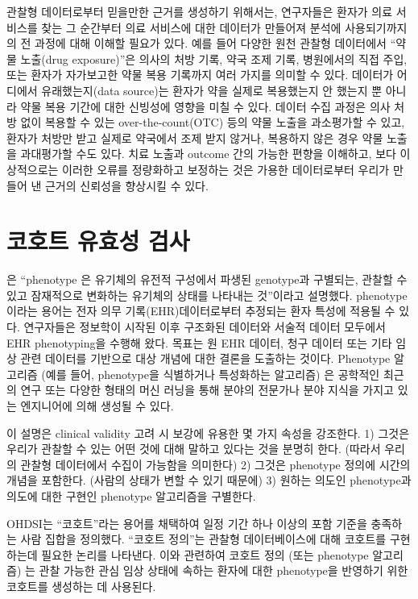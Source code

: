 \documentclass[11pt]{book}
\theoremstyle{definition}
\theoremstyle{definition}
\theoremstyle{definition}
\theoremstyle{remark}
\begin{document}
관찰형 데이터로부터 믿을만한 근거를 생성하기 위해서는, 연구자들은 환자가
의료 서비스를 찾는 그 순간부터 의료 서비스에 대한 데이터가 만들어져
분석에 사용되기까지의 전 과정에 대해 이해할 필요가 있다. 예를 들어
다양한 원천 관찰형 데이터에서 ``약물 노출(drug exposure)''은 의사의 처방
기록, 약국 조제 기록, 병원에서의 직접 주입, 또는 환자가 자가보고한 약물
복용 기록까지 여러 가지를 의미할 수 있다. 데이터가 어디에서
유래했는지(data source)는 환자가 약을 실제로 복용했는지 안 했는지 뿐
아니라 약물 복용 기간에 대한 신빙성에 영향을 미칠 수 있다. 데이터 수집
과정은 의사 처방 없이 복용할 수 있는 over-the-count(OTC) 등의 약물
노출을 과소평가할 수 있고, 환자가 처방만 받고 실제로 약국에서 조제 받지
않거나, 복용하지 않은 경우 약물 노출을 과대평가할 수도 있다. 치료 노출과
outcome 간의 가능한 편향을 이해하고, 보다 이상적으로는 이러한 오류를
정량화하고 보정하는 것은 가용한 데이터로부터 우리가 만들어 낸 근거의
신뢰성을 향상시킬 수 있다.

\section{코호트 유효성 검사}\label{CohortValidation}

\citet{hripcsak_2017} 은 ``phenotype 은 유기체의 유전적 구성에서 파생된
genotype과 구별되는, 관찰할 수 있고 잠재적으로 변화하는 유기체의 상태를
나타내는 것''이라고 설명했다. phenotype이라는 용어는 전자 의무
기록(EHR)데이터로부터 추정되는 환자 특성에 적용될 수 있다. 연구자들은
정보학이 시작된 이후 구조화된 데이터와 서술적 데이터 모두에서 EHR
phenotyping을 수행해 왔다. 목표는 원 EHR 데이터, 청구 데이터 또는 기타
임상 관련 데이터를 기반으로 대상 개념에 대한 결론을 도출하는 것이다.
Phenotype 알고리즘 (예를 들어, phenotype을 식별하거나 특성화하는
알고리즘) 은 공학적인 최근의 연구 또는 다양한 형태의 머신 러닝을 통해
분야의 전문가나 분야 지식을 가지고 있는 엔지니어에 의해 생성될 수 있다.

이 설명은 clinical validity 고려 시 보강에 유용한 몇 가지 속성을
강조한다. 1) 그것은 우리가 관찰할 수 있는 어떤 것에 대해 말하고 있다는
것을 분명히 한다. (따라서 우리의 관찰형 데이터에서 수집이 가능함을
의미한다) 2) 그것은 phenotype 정의에 시간의 개념을 포함한다. (사람의
상태가 변할 수 있기 때문에) 3) 원하는 의도인 phenotype과 의도에 대한
구현인 phenotype 알고리즘을 구별한다.

OHDSI는 ``코호트''라는 용어를 채택하여 일정 기간 하나 이상의 포함 기준을
충족하는 사람 집합을 정의했다. ``코호트 정의''는 관찰형 데이터베이스에
대해 코호트를 구현하는데 필요한 논리를 나타낸다. 이와 관련하여 코호트
정의 (또는 phenotype 알고리즘) 는 관찰 가능한 관심 임상 상태에 속하는
환자에 대한 phenotype을 반영하기 위한 코호트를 생성하는 데 사용된다.
\end{document}
